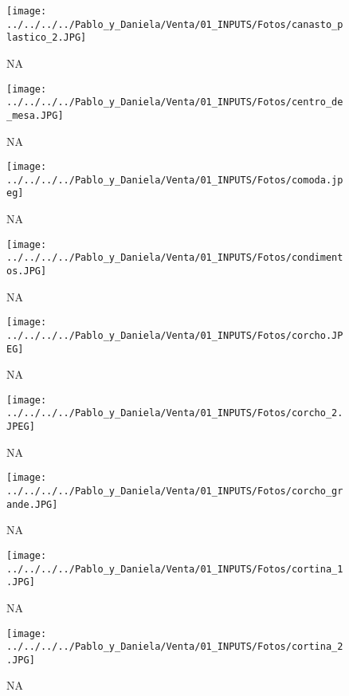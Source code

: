 \documentclass[
]{article}
\begin{document}
\pagebreak

\begin{figure}
\centering
\texttt{[image: ../../../../Pablo\_y\_Daniela/Venta/01\_INPUTS/Fotos/canasto\_plastico\_2.JPG]}
\caption{NA}
\end{figure}

\pagebreak

\begin{figure}
\centering
\texttt{[image: ../../../../Pablo\_y\_Daniela/Venta/01\_INPUTS/Fotos/centro\_de\_mesa.JPG]}
\caption{NA}
\end{figure}

\pagebreak

\begin{figure}
\centering
\texttt{[image: ../../../../Pablo\_y\_Daniela/Venta/01\_INPUTS/Fotos/comoda.jpeg]}
\caption{NA}
\end{figure}

\pagebreak

\begin{figure}
\centering
\texttt{[image: ../../../../Pablo\_y\_Daniela/Venta/01\_INPUTS/Fotos/condimentos.JPG]}
\caption{NA}
\end{figure}

\pagebreak

\begin{figure}
\centering
\texttt{[image: ../../../../Pablo\_y\_Daniela/Venta/01\_INPUTS/Fotos/corcho.JPEG]}
\caption{NA}
\end{figure}

\pagebreak

\begin{figure}
\centering
\texttt{[image: ../../../../Pablo\_y\_Daniela/Venta/01\_INPUTS/Fotos/corcho\_2.JPEG]}
\caption{NA}
\end{figure}

\pagebreak

\begin{figure}
\centering
\texttt{[image: ../../../../Pablo\_y\_Daniela/Venta/01\_INPUTS/Fotos/corcho\_grande.JPG]}
\caption{NA}
\end{figure}

\pagebreak

\begin{figure}
\centering
\texttt{[image: ../../../../Pablo\_y\_Daniela/Venta/01\_INPUTS/Fotos/cortina\_1.JPG]}
\caption{NA}
\end{figure}

\pagebreak

\begin{figure}
\centering
\texttt{[image: ../../../../Pablo\_y\_Daniela/Venta/01\_INPUTS/Fotos/cortina\_2.JPG]}
\caption{NA}
\end{figure}
\end{document}
